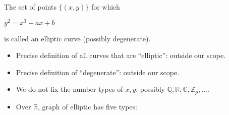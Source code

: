 \begin{frame}
\begin{definition}
The set of points $\{(x,y)\}$ for which 

\hfil \hfil $
y^2 = x^3 + a x + b
$

is called an elliptic curve (possibly degenerate).
\end{definition}
\begin{itemize}
\item Precise definition of all curves that are ``elliptic'': outside our scope.
\item Precise definition of ``degenerate'': outside our scope.
\item We do not fix the number types of $x,y$: possibly $\mathbb Q, \mathbb R, \mathbb C, \mathbb Z_p, \dots$.
\item Over $\mathbb R$, graph of elliptic has five types:


\end{itemize}
\end{frame}
